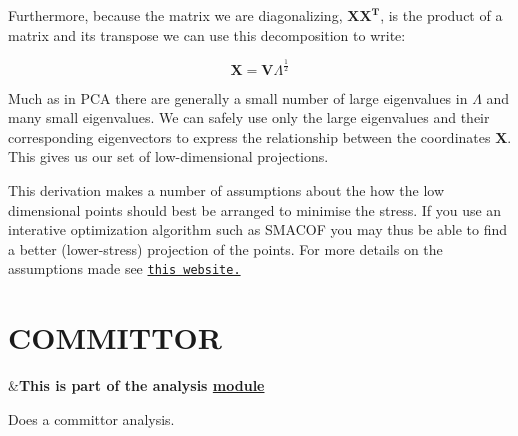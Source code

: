 Furthermore, because the matrix we are diagonalizing, $\mathbf{X X^T}$, is the product of a matrix and its transpose we can use this decomposition to write\+:

\[ \mathbf{X} =\mathbf{V} \Lambda^\frac{1}{2} \]

Much as in P\+C\+A there are generally a small number of large eigenvalues in $\Lambda$ and many small eigenvalues. We can safely use only the large eigenvalues and their corresponding eigenvectors to express the relationship between the coordinates $\mathbf{X}$. This gives us our set of low-\/dimensional projections.

This derivation makes a number of assumptions about the how the low dimensional points should best be arranged to minimise the stress. If you use an interative optimization algorithm such as S\+M\+A\+C\+O\+F you may thus be able to find a better (lower-\/stress) projection of the points. For more details on the assumptions made see \href{http://quest4rigor.com/tag/multidimensional-scaling/}{\tt this website.} \hypertarget{COMMITTOR}{}\section{C\+O\+M\+M\+I\+T\+T\+O\+R}\label{COMMITTOR}
\begin{TabularC}{2}
\hline
&{\bfseries  This is part of the analysis \hyperlink{mymodules}{module }}   \\
\end{TabularC}
Does a committor analysis.


